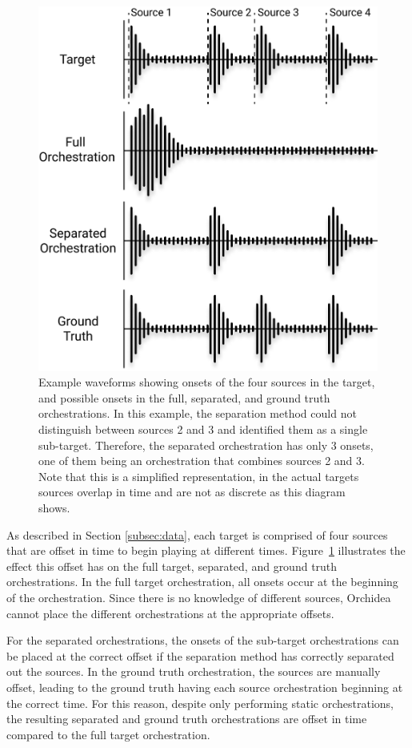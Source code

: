 \documentclass{article}
\begin{document}
    \begin{figure}[t]
    \centering
      \includegraphics[width=0.7\columnwidth]{figures/orch.jpg}
      \caption{Example waveforms showing onsets of the four sources in the target, and possible onsets in the full, separated, and ground truth orchestrations. In this example, the separation method could not distinguish between sources 2 and 3 and identified them as a single sub-target. Therefore, the separated orchestration has only 3 onsets, one of them being an orchestration that combines sources 2 and 3. Note that this is a simplified representation, in the actual targets sources overlap in time and are not as discrete as this diagram shows.}\label{fig:orchestrations}
    \end{figure}    
    
    As described in Section \ref{subsec:data}, each target is comprised of four sources that are offset in time to begin playing at different times. Figure~\ref{fig:orchestrations} illustrates the effect this offset has on the full target, separated, and ground truth orchestrations. In the full target orchestration, all onsets occur at the beginning of the orchestration. Since there is no knowledge of different sources, Orchidea cannot place the different orchestrations at the appropriate offsets. 
    
    For the separated orchestrations, the onsets of the sub-target orchestrations can be placed at the correct offset if the separation method has correctly separated out the sources. In the ground truth orchestration, the sources are manually offset, leading to the ground truth having each source orchestration beginning at the correct time. For this reason, despite only performing static orchestrations, the resulting separated and ground truth orchestrations are offset in time compared to the full target orchestration.
    
\end{document}
